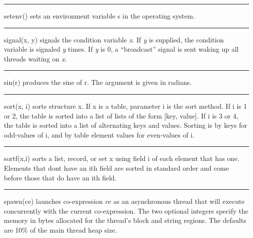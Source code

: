 \bigskip\hrule\vspace{0.1cm}

\noindent
{}\textsf{setenv()} sets an environment variable
\textsf{s} in the operating system.

\bigskip\hrule\vspace{0.1cm}

\noindent
{}\textsf{signal(x, y)} signals the condition variable
{\textit x}. If {\textit y} is supplied, the condition variable is
signaled {\textit y} times. If {\textit y} is 0, a ``broadcast''
signal is sent waking up all threads waiting on {\textit x}.

\bigskip\hrule\vspace{0.1cm}

\noindent
{}sin(r) produces the sine of r. The argument is given in
radians.

\bigskip\hrule\vspace{0.1cm}

\noindent
{}\textsf{sort(x, i)} sorts structure \textsf{x}. If
\textsf{x} is a table, parameter \textsf{i} is the sort method. If
\textsf{i} is 1 or 2, the table is sorted into a list of lists of the
form [key, value]. If \textsf{i} is 3 or 4, the table is sorted into a
list of alternating keys and values. Sorting is by keys for odd-values
of \textsf{i}, and by table element values for even-values of
\textsf{i}.

\bigskip\hrule\vspace{0.1cm}

\noindent
{}\textsf{sortf(x,i)} sorts a list, record, or set
\textsf{x} using field \textsf{i} of each element that has one.
Elements that don{\textquotesingle}t have an
\textsf{i}{\textquotesingle}th field are sorted in standard order and
come before those that do have an \textsf{i}{\textquotesingle}th field.

\bigskip\hrule\vspace{0.1cm}

\noindent
{}\textsf{spawn(ce)} launches co-expression {\textit ce} as an
asynchronous thread that will execute concurrently with the current
co-expression. The two optional integers specify the memory in bytes
allocated for the thread's block and string regions. The defaults are 10\%
of the main thread heap size.

